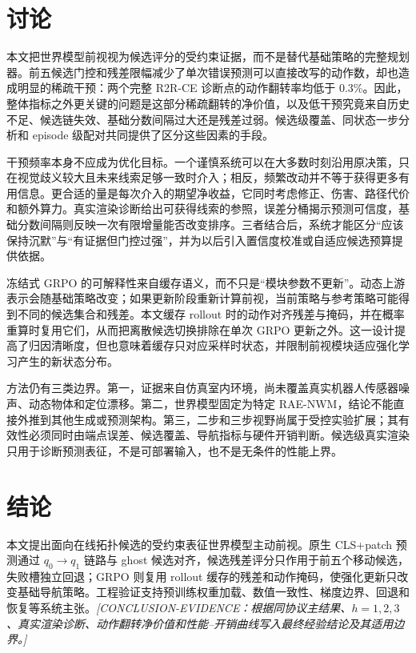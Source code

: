 \documentclass[UTF8,11pt]{ctexart}
\begin{document}
\section{讨论}

本文把世界模型前视视为候选评分的受约束证据，而不是替代基础策略的完整规划器。前五候选门控和残差限幅减少了单次错误预测可以直接改写的动作数，却也造成明显的稀疏干预：两个完整 R2R-CE 诊断点的动作翻转率均低于 0.3\%。因此，整体指标之外更关键的问题是这部分稀疏翻转的净价值，以及低干预究竟来自历史不足、候选链失效、基础分数间隔过大还是残差过弱。候选级覆盖、同状态一步分析和 episode 级配对共同提供了区分这些因素的手段。

干预频率本身不应成为优化目标。一个谨慎系统可以在大多数时刻沿用原决策，只在视觉歧义较大且未来线索足够一致时介入；相反，频繁改动并不等于获得更多有用信息。更合适的量是每次介入的期望净收益，它同时考虑修正、伤害、路径代价和额外算力。真实渲染诊断给出可获得线索的参照，误差分桶揭示预测可信度，基础分数间隔则反映一次有限增量能否改变排序。三者结合后，系统才能区分“应该保持沉默”与“有证据但门控过强”，并为以后引入置信度校准或自适应候选预算提供依据。

冻结式 GRPO 的可解释性来自缓存语义，而不只是“模块参数不更新”。动态上游表示会随基础策略改变；如果更新阶段重新计算前视，当前策略与参考策略可能得到不同的候选集合和残差。本文缓存 rollout 时的动作对齐残差与掩码，并在概率重算时复用它们，从而把离散候选切换排除在单次 GRPO 更新之外。这一设计提高了归因清晰度，但也意味着缓存只对应采样时状态，并限制前视模块适应强化学习产生的新状态分布。

方法仍有三类边界。第一，证据来自仿真室内环境，尚未覆盖真实机器人传感器噪声、动态物体和定位漂移。第二，世界模型固定为特定 RAE-NWM，结论不能直接外推到其他生成或预测架构。第三，二步和三步视野尚属于受控实验扩展；其有效性必须同时由端点误差、候选覆盖、导航指标与硬件开销判断。候选级真实渲染只用于诊断预测表征，不是可部署输入，也不是无条件的性能上界。

\section{结论}

本文提出面向在线拓扑候选的受约束表征世界模型主动前视。原生 CLS+patch 预测通过 $q_0\rightarrow q_1$ 链路与 ghost 候选对齐，候选残差评分只作用于前五个移动候选，失败槽独立回退；GRPO 则复用 rollout 缓存的残差和动作掩码，使强化更新只改变基础导航策略。工程验证支持预训练权重加载、数值一致性、梯度边界、回退和恢复等系统主张。\textit{[CONCLUSION-EVIDENCE：根据同协议主结果、$h=1,2,3$、真实渲染诊断、动作翻转净价值和性能--开销曲线写入最终经验结论及其适用边界。]}



\end{document}
